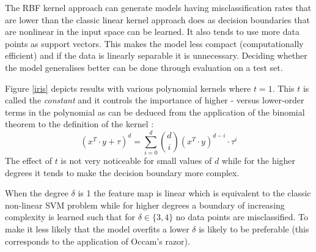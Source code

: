 \par\noindent The RBF kernel approach can generate models having misclassification rates that are lower than the classic linear kernel approach does as decision boundaries that are nonlinear in the input space can be learned. It also tends to use more data points as support vectors. This makes the model less compact (computationally efficient) and if the data is linearly separable it is unnecessary. Deciding whether the model generalises better can be done through evaluation on a test set.


Figure \ref{iris} depicts results with various polynomial kernels where $t=1$. This $t$ is called the \textit{constant} and it controls the importance of higher - versus lower-order terms in the polynomial as can be deduced from the application of the binomial theorem to the definition of the kernel :
$$(x^T\cdot y+\tau)^d=\sum_{i=0}^d\binom{d}{i}(x^T\cdot y)^{d-i}\cdot \tau^i$$
The effect of $t$ is not very noticeable for small values of $d$ while for the higher degrees it tends to make the decision boundary more complex.

\par\noindent When the degree $\delta$ is 1 the feature map is linear which is equivalent to the classic non-linear SVM problem while for higher degrees a boundary of increasing complexity is learned such that for $\delta\in\{3,4\}$ no data points are misclassified. To make it less likely that the model overfits a lower $\delta$ is likely to be preferable (this corresponds to the application of Occam's razor).

